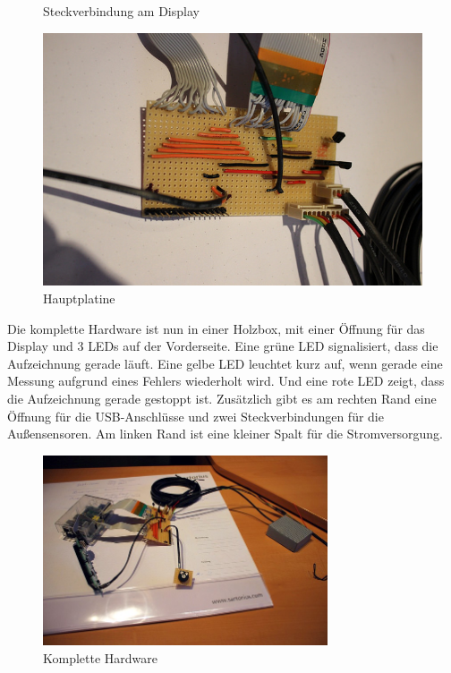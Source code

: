 \begin{figure}[h]
\begin{minipage}[b]{0.45\textwidth}
		\caption{Steckverbindung am Display}
	\end{minipage}\hfill
	\begin{minipage}[b]{0.45\textwidth}
		\centering
		\includegraphics[width=\textwidth]{figures/anschluss/2_4.jpg}
		\caption{Hauptplatine}
	\end{minipage}
\end{figure}

Die komplette Hardware ist nun in einer Holzbox, mit einer Öffnung für das Display und 3  \glspl{LED} auf der Vorderseite. Eine grüne \gls{LED} signalisiert, dass die Aufzeichnung gerade läuft. Eine gelbe \gls{LED} leuchtet kurz auf, wenn gerade eine Messung aufgrund eines Fehlers wiederholt wird. Und eine rote \gls{LED} zeigt, dass die Aufzeichnung gerade gestoppt ist. Zusätzlich gibt es am rechten Rand eine Öffnung für die USB-Anschlüsse und zwei Steckverbindungen für die Außensensoren. Am linken Rand ist eine kleiner Spalt für die Stromversorgung.

\begin{figure}[h]
	\centering
	\includegraphics[width=0.75\textwidth]{figures/anschluss/2_5.jpg}
	\caption{Komplette Hardware}
\end{figure}	

